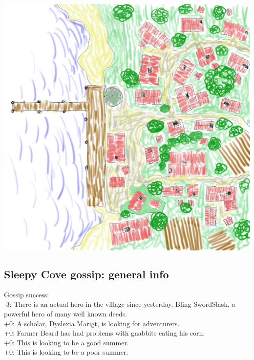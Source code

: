 \begin{center}
\includegraphics[width=1.0\linewidth]{./maps/Sleepy-Cove-(100x100,16+0+0).jpg}
\end{center}


\subsection*{Sleepy Cove gossip: general info}
Gossip success:\\
-3: There is an actual hero in the village since yesterday. Bling SwordSlash, a powerful hero of many well known deeds.  \\
+0: A scholar, Dyslexia Marigt, is looking for adventurers. \\
+0: Farmer Beard has had problems with gnabbits eating his corn. \\
+0: This is looking to be a good summer. \\
+0: This is looking to be a poor summer. \\


